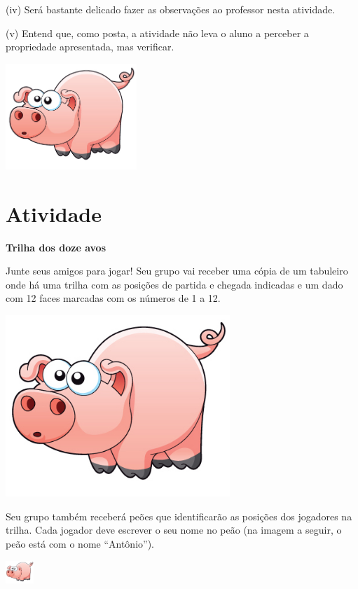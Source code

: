 \documentclass[a4,12pt]{book}
\newcounter{atividade}
\begin{document}
(iv) Será bastante delicado fazer as observações ao professor nesta atividade.  

(v) Entend que, como posta, a atividade não leva o aluno a perceber a propriedade apresentada, mas verificar. 





\includegraphics[width=\textwidth,height=4cm, keepaspectratio]{pig}
\section{Atividade}







{\bf Trilha dos doze avos}

Junte seus amigos para jogar! Seu grupo vai receber uma cópia de um tabuleiro onde há uma trilha com as posições de partida e chegada indicadas e um dado com 12 faces marcadas com os números de 1 a 12. 

\includegraphics[width=240pt, keepaspectratio]{pig}

Seu grupo também receberá peões que identificarão as posições dos jogadores na trilha. Cada jogador deve escrever o seu nome no peão (na imagem a seguir, o peão está com o nome ``Antônio'').

\includegraphics[width=30pt, keepaspectratio]{pig}
\end{document}
